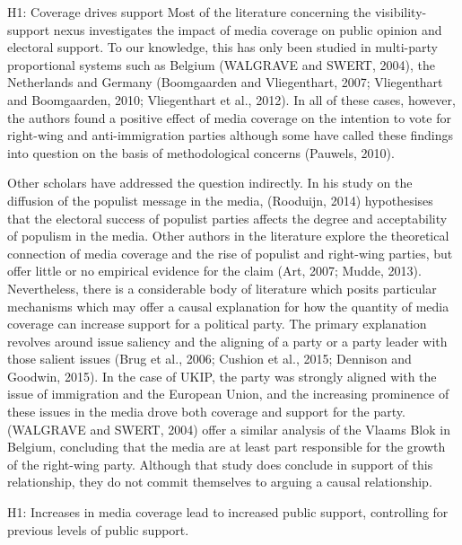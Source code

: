 \documentclass[12pt,article]{article}
\begin{document}
H1: Coverage drives support Most of the literature concerning the
visibility-support nexus investigates the impact of media coverage on
public opinion and electoral support. To our knowledge, this has only
been studied in multi-party proportional systems such as Belgium
(WALGRAVE and SWERT, 2004), the Netherlands and Germany (Boomgaarden and
Vliegenthart, 2007; Vliegenthart and Boomgaarden, 2010; Vliegenthart et
al., 2012). In all of these cases, however, the authors found a positive
effect of media coverage on the intention to vote for right-wing and
anti-immigration parties although some have called these findings into
question on the basis of methodological concerns (Pauwels, 2010).

Other scholars have addressed the question indirectly. In his study on
the diffusion of the populist message in the media, (Rooduijn, 2014)
hypothesises that the electoral success of populist parties affects the
degree and acceptability of populism in the media. Other authors in the
literature explore the theoretical connection of media coverage and the
rise of populist and right-wing parties, but offer little or no
empirical evidence for the claim (Art, 2007; Mudde, 2013). Nevertheless,
there is a considerable body of literature which posits particular
mechanisms which may offer a causal explanation for how the quantity of
media coverage can increase support for a political party. The primary
explanation revolves around issue saliency and the aligning of a party
or a party leader with those salient issues (Brug et al., 2006; Cushion
et al., 2015; Dennison and Goodwin, 2015). In the case of UKIP, the
party was strongly aligned with the issue of immigration and the
European Union, and the increasing prominence of these issues in the
media drove both coverage and support for the party. (WALGRAVE and
SWERT, 2004) offer a similar analysis of the Vlaams Blok in Belgium,
concluding that the media are at least part responsible for the growth
of the right-wing party. Although that study does conclude in support of
this relationship, they do not commit themselves to arguing a causal
relationship.

H1: Increases in media coverage lead to increased public support,
controlling for previous levels of public support.
\end{document}
